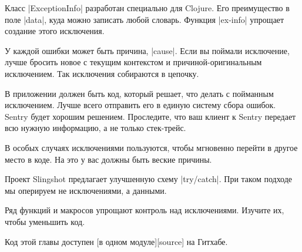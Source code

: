 Класс \spverb|ExceptionInfo| разработан специально для Clojure. Его преимущество в поле
\spverb|data|, куда можно записать любой словарь. Функция \spverb|ex-info| упрощает создание
этого исключения.

У каждой ошибки может быть причина, \spverb|cause|. Если вы поймали исключение, лучше
бросить новое с текущим контекстом и причиной-оригинальным исключением. Так
исключения собираются в цепочку.

В приложении должен быть код, который решает, что делать с пойманным
исключением. Лучше всего отправить его в единую систему сбора ошибок. Sentry
будет хорошим решением. Проследите, что ваш клиент к Sentry передает всю нужную
информацию, а не только стек-трейс.

В особых случаях исключениями пользуются, чтобы мгновенно перейти в другое место
в коде. На это у вас должны быть веские причины.

Проект Slingshot предлагает улучшенную схему \spverb|try/catch|. При таком подходе мы
оперируем не исключениями, а данными.

Ряд функций и макросов упрощают контроль над исключениями. Изучите их, чтобы
уменьшить код.


Код этой главы доступен [в одном модуле][source] на Гитхабе.

